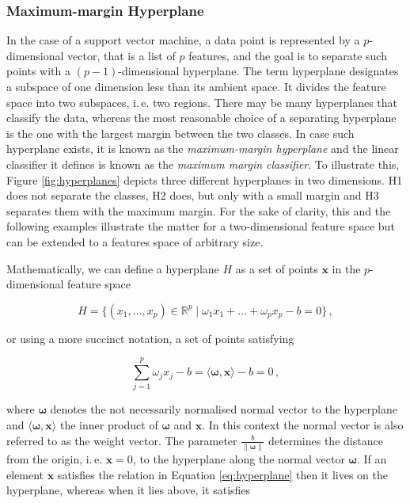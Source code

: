\subsubsection{Maximum-margin Hyperplane}

In the case of a support vector machine, a data point is represented by a $p$-dimensional vector, that is a list of $p$ features, and the goal is to  separate such points with a $(p-1)$-dimensional hyperplane. The term hyperplane designates a subspace of one dimension less than its ambient space. It divides the feature space into two subspaces, i.\,e. two regions. There may be many hyperplanes that classify the data, whereas the most reasonable choice of a separating hyperplane is the one with the largest margin between the two classes. In case such hyperplane exists, it is known as the \emph{maximum-margin hyperplane} and the linear classifier it defines is known as the \emph{maximum margin classifier}. To illustrate this, Figure \ref{fig:hyperplanes} depicts three different hyperplanes in two dimensions. H1 does not separate the classes, H2 does, but only with a small margin and H3 separates them with the maximum margin. For the sake of clarity, this and the following examples illustrate the matter for a two-dimensional feature space but can be extended to a features space of arbitrary size.



Mathematically, we can define a hyperplane $H$ as a set of points $\bm{x}$ in the $p$-dimensional feature space

\begin{equation}
H = \{ (x_1, \dots, x_p) \in \mathbb{R}^p \mid \omega_1 x_1 + \dots + \omega_p x_p - b = 0 \}\,,
\end{equation}

\noindent
or using a more succinct notation, a set of points satisfying

\begin{equation}
\sum_{j = 1}^{p} \omega_j x_j - b = \langle \bm{\omega} , \bm{x} \rangle - b = 0\,,
\label{eq:hyperplane}
\end{equation}

\noindent
where $\bm{\omega}$ denotes the not necessarily normalised normal vector to the hyperplane and $\langle \bm{\omega} , \bm{x} \rangle$ the inner product of $\bm{\omega}$ and $\bm{x}$. In this context the normal vector is also referred to as  the weight vector. The parameter $\frac{b}{\|\bm{\omega}\|}$ determines the distance from the origin, i.\,e. $\bm{x} = 0$, to the hyperplane along the normal vector $\bm{\omega}$. If an element $\bm{x}$ satisfies the relation in Equation \ref{eq:hyperplane} then it lives on the hyperplane, whereas when it lies above, it satisfies

